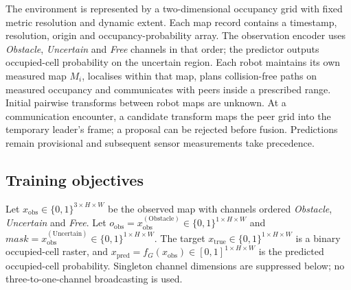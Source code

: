 \documentclass[11pt]{article}
\begin{document}
The environment is represented by a two-dimensional occupancy grid with fixed metric resolution and dynamic extent. Each map record contains a timestamp, resolution, origin and occupancy-probability array. The observation encoder uses \emph{Obstacle}, \emph{Uncertain} and \emph{Free} channels in that order; the predictor outputs occupied-cell probability on the uncertain region. Each robot maintains its own measured map $M_i$, localises within that map, plans collision-free paths on measured occupancy and communicates with peers inside a prescribed range. Initial pairwise transforms between robot maps are unknown. At a communication encounter, a candidate transform maps the peer grid into the temporary leader's frame; a proposal can be rejected before fusion. Predictions remain provisional and subsequent sensor measurements take precedence.

\subsection{Training objectives} \label{app:losses}

Let $x_{\text{obs}}\in\{0,1\}^{3\times H\times W}$ be the observed map with channels ordered \emph{Obstacle}, \emph{Uncertain} and \emph{Free}. Let $o_{\text{obs}}=x_{\text{obs}}^{(\mathrm{Obstacle})}\in\{0,1\}^{1\times H\times W}$ and $\textit{mask}=x_{\text{obs}}^{(\mathrm{Uncertain})}\in\{0,1\}^{1\times H\times W}$. The target $x_{\text{true}}\in\{0,1\}^{1\times H\times W}$ is a binary occupied-cell raster, and $x_{\text{pred}}=f_G(x_{\text{obs}})\in[0,1]^{1\times H\times W}$ is the predicted occupied-cell probability. Singleton channel dimensions are suppressed below; no three-to-one-channel broadcasting is used.
\end{document}
